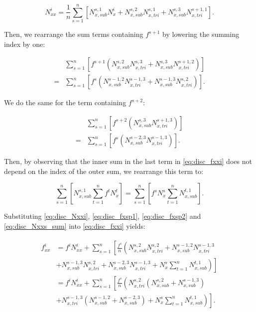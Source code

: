 \documentclass{article}
\begin{document}
\begin{equation} \label{eq:disc_Nxxi}
N_{xx}^i = \frac{1}{n} \sum_{s=1}^n \left[ N_{x,sub}^{s,1} N_x^i + N_{x,sub}^{s,2} N_{x,tri}^{s,1} + N_{x,sub}^{s,3} N_{x,tri}^{s+1,1} \right].
\end{equation}

Then, we rearrange the sum terms containing $f^{s+1}$ by lowering the summing index by one:

\begin{equation} \label{eq:disc_fxsp1}
\begin{split}
     & \sum_{s=1}^n \left[ f^{s+1} \left( N_{x,sub}^{s,2} N_{x,tri}^{s,3} + N_{x,sub}^{s,3} N_{x,tri}^{s+1,2} \right) \right] \\
     = & \sum_{s=1}^n \left[ f^s \left( N_{x,sub}^{s-1,2} N_{x,tri}^{s-1,3} + N_{x,sub}^{s-1,3} N_{x,tri}^{s,2} \right) \right].
\end{split}
\end{equation}

We do the same for the term containing $f^{s+2}$:

\begin{equation} \label{eq:disc_fxsp2}
\begin{split}
     & \sum_{s=1}^n \left[ f^{s+2} \left( N_{x,sub}^{s,3} N_{x,tri}^{s+1,3} \right) \right] \\
     = & \sum_{s=1}^n \left[ f^s \left( N_{x,sub}^{s-2,3} N_{x,tri}^{s-1,3} \right) \right].
\end{split}
\end{equation}

Then, by observing that the inner sum in the last term in \eqref{eq:disc_fxxi} does not depend on the index of the outer sum, we rearrange this term to:

\begin{equation} \label{eq:disc_Nxxs_sum}
\sum_{s=1}^n \left[ N_{x,sub}^{s,1} \sum_{t=1}^n f^t N_x^t \right] = \sum_{s=1}^n \left[ f^s N_x^s \sum_{t=1}^n N_{x,sub}^{t,1} \right].
\end{equation}

Substituting \eqref{eq:disc_Nxxi}, \eqref{eq:disc_fxsp1}, \eqref{eq:disc_fxsp2} and \eqref{eq:disc_Nxxs_sum} into \eqref{eq:disc_fxxi} yields:

\begin{align} \label{eq:disc_fxxi2}
\begin{split}
f_{xx}^i &= f^i N_{xx}^i + \sum_{s=1}^n \left[ \frac{f^s}{n} \left( N_{x,sub}^{s,2} N_{x,tri}^{s,2} + N_{x,sub}^{s-1,2} N_{x,tri}^{s-1,3} \right. \right. \\
 & \left. \left. + N_{x,sub}^{s-1,3} N_{x,tri}^{s,2} + N_{x,sub}^{s-2,3} N_{x,tri}^{s-1,3} + N_x^s \sum_{t=1}^n N_{x,sub}^{t,1} \right) \right] \\
& = f^i N_{xx}^i + \sum_{s=1}^n \left[ \frac{f^s}{n} \left( N_{x,tri}^{s,2} \left( N_{x,sub}^{s,2} + N_{x,sub}^{s-1,3} \right) \right. \right. \\
 & \left. \left. + N_{x,tri}^{s-1,3} \left( N_{x,sub}^{s-1,2} + N_{x,sub}^{s-2,3} \right) + N_x^s \sum_{t=1}^n N_{x,sub}^{t,1} \right) \right].
\end{split}
\end{align}
\end{document}
